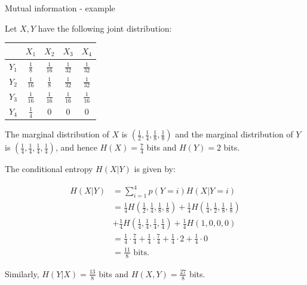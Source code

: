 \begin{vbframe} {Mutual information - example}

Let $X, Y$ have the following joint distribution:

\begin{table}[]
  \begin{tabular}{c|c|c|c|c|}
    & $X_1$ & $X_2$ & $X_3$ & $X_4$ \\ 
    \hline
    $Y_1$ & $\frac{1}{8}$ & $\frac{1}{16}$ & $\frac{1}{32}$ & $\frac{1}{32}$ \\
    \hline
    $Y_2$ & $\frac{1}{16}$ & $\frac{1}{8}$ & $\frac{1}{32}$ & $\frac{1}{32}$ \\
    \hline
    $Y_3$ & $\frac{1}{16}$ & $\frac{1}{16}$ & $\frac{1}{16}$ & $\frac{1}{16}$ \\
    \hline
    $Y_4$ & $\frac{1}{4}$ & 0 & 0 & 0 \\
    \hline
  \end{tabular}
\end{table}

\lz

The marginal distribution of $X$ is $(\frac{1}{2}, \frac{1}{4}, \frac{1}{8}, \frac{1}{8})$ and the marginal distribution of $Y$ is $(\frac{1}{4}, \frac{1}{4}, \frac{1}{4}, \frac{1}{4})$, and hence $H(X) = \frac{7}{4}$ bits and $H(Y) = 2$ bits.

\framebreak

The conditional entropy $H(X|Y)$ is given by:

\begin{equation*}
  \begin{aligned}
    H(X|Y) &= \sum_{i = 1}^4 p(Y = i) H(X | Y = i) \\
    &= \frac{1}{4} H \left( \frac{1}{2}, \frac{1}{4}, \frac{1}{8}, \frac{1}{8} \right) +     \frac{1}{4} H \left( \frac{1}{4}, \frac{1}{2}, \frac{1}{8}, \frac{1}{8} \right) \\
    &+ \frac{1}{4} H \left( \frac{1}{4}, \frac{1}{4}, \frac{1}{4}, \frac{1}{4} \right) +     \frac{1}{4} H \left(1,0,0,0 \right) \\
    &=  \frac{1}{4} \cdot \frac{7}{4} + \frac{1}{4} \cdot \frac{7}{4} + \frac{1}{4} \cdot     2 + \frac{1}{4} \cdot 0 \\
    &= \frac{11}{8} \text{ bits}.
  \end{aligned}
\end{equation*}

Similarly, $H(Y|X) = \frac{13}{8}$ bits and $H(X,Y) = \frac{27}{8}$ bits.

\end{vbframe}


